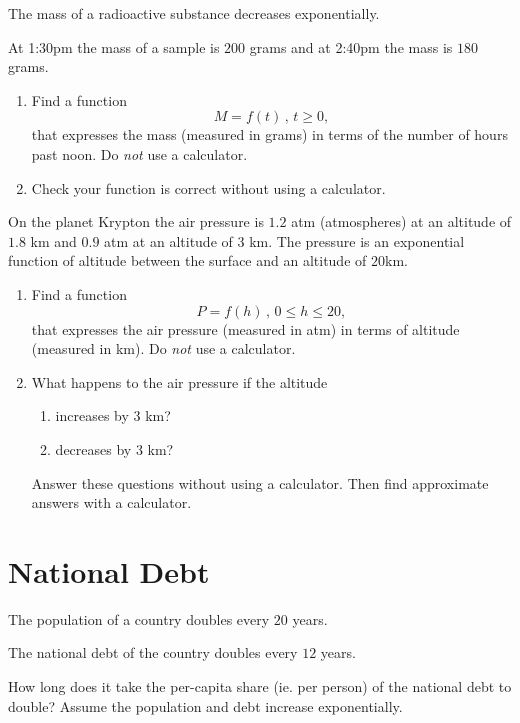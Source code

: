 \documentclass{ximera}
\begin{document}
\begin{question} \label{Qdfe34vv}
The mass of a radioactive substance decreases exponentially.

At 1:30pm the mass of a sample is $200$ grams and at 2:40pm the mass is $180$ grams.
\begin{enumerate}
\item Find a function 
\[
    M = f(t) \, , \, t\geq 0,
\]
that expresses the mass (measured in grams) in terms of the number of hours past noon. Do \emph{not} use a calculator.

\item Check your function is correct without using a calculator.

\end{enumerate}

\end{question}


\begin{question} \label{QKdfee3gz}
On the planet Krypton the air pressure is $1.2$ atm (atmospheres) at an altitude of $1.8$ km and $0.9$ atm at an altitude of $3$ km. The pressure is an exponential function of altitude between the surface and an altitude of $20$km.

\begin{enumerate}
\item Find a function 
\[
     P = f(h) \, , \, 0\leq h \leq 20,
\]
that expresses the air pressure (measured in atm) in terms of altitude (measured in km). Do \emph{not} use a calculator.

\item What happens to the air pressure if the altitude

\begin{enumerate}
\item  increases by $3$ km?

\item decreases by $3$ km?
\end{enumerate}

Answer these questions without using a calculator. Then find approximate answers with a calculator.

\end{enumerate}
\end{question}

\section{National Debt}

\begin{question} \label{Qpf33vv}
The population of a country doubles every $20$ years.

The national debt of the country doubles every $12$ years.

How long does it take the per-capita share (ie. per person) of the national debt to double? Assume the population and debt increase exponentially.
\end{question}
\end{document}
